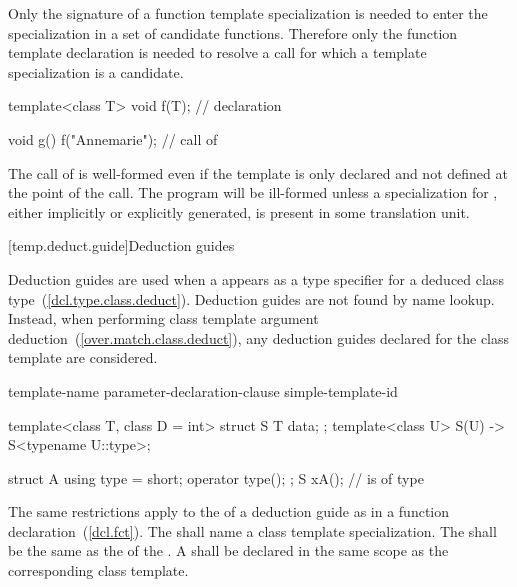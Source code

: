 \pnum
Only the signature of a function template specialization is needed to enter the
specialization in a set of candidate functions.
Therefore only the function template declaration is needed to resolve a call
for which a template specialization is a candidate.
\begin{example}

\begin{codeblock}
template<class T> void f(T);    // declaration

void g() {
  f("Annemarie");               // call of 
}
\end{codeblock}

The call of
is well-formed even if the template
is only declared and not defined at the point of the call.
The program will be ill-formed unless a specialization for
,
either implicitly or explicitly generated,
is present in some translation unit.
\end{example}%

[temp.deduct.guide]{Deduction guides}
%

\pnum
Deduction guides are used
when a  appears
as a type specifier
for a deduced class type~(\ref{dcl.type.class.deduct}).
Deduction guides are not found by name lookup.
Instead, when performing class template argument deduction~(\ref{over.match.class.deduct}),
any deduction guides declared for the class template are considered.

\begin{bnf}
\br
    \opt{} template-name \terminal{(} parameter-declaration-clause \terminal{) ->} simple-template-id \terminal{;}
\end{bnf}

\pnum
\begin{example}
\begin{codeblock}
template<class T, class D = int>
struct S {
  T data;
};
template<class U>
S(U) -> S<typename U::type>;

struct A {
  using type = short;
  operator type();
};
S x{A()};  //  is of type 
\end{codeblock}
\end{example}

\pnum
The same restrictions apply
to the 
of a deduction guide
as in a function declaration~(\ref{dcl.fct}).
The 
shall name a class template specialization.
The 
shall be the same 
as the 
of the .
A 
shall be declared
in the same scope
as the corresponding class template.

